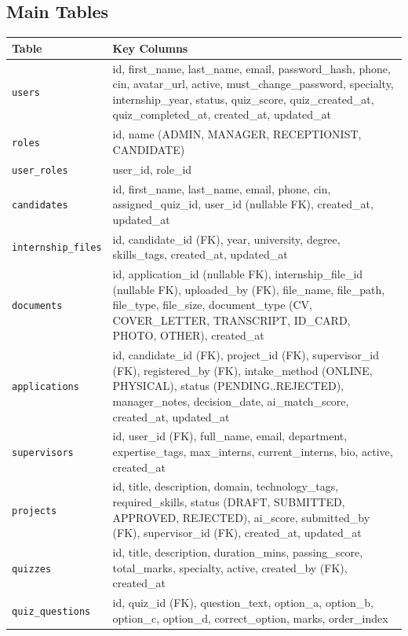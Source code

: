 \subsection{Main Tables}
\begin{table}[H]
\centering
\small
\begin{tabular}{|p{3cm}|p{10cm}|}
\hline
\rowcolor{gray!20}
\textbf{Table} & \textbf{Key Columns} \\
\hline
\texttt{users} & id, first\_name, last\_name, email, password\_hash, phone, cin, avatar\_url, active, must\_change\_password, specialty, internship\_year, status, quiz\_score, quiz\_created\_at, quiz\_completed\_at, created\_at, updated\_at \\
\hline
\texttt{roles} & id, name (ADMIN, MANAGER, RECEPTIONIST, CANDIDATE) \\
\hline
\texttt{user\_roles} & user\_id, role\_id \\
\hline
\texttt{candidates} & id, first\_name, last\_name, email, phone, cin, assigned\_quiz\_id, user\_id (nullable FK), created\_at, updated\_at \\
\hline
\texttt{internship\_files} & id, candidate\_id (FK), year, university, degree, skills\_tags, created\_at, updated\_at \\
\hline
\texttt{documents} & id, application\_id (nullable FK), internship\_file\_id (nullable FK), uploaded\_by (FK), file\_name, file\_path, file\_type, file\_size, document\_type (CV, COVER\_LETTER, TRANSCRIPT, ID\_CARD, PHOTO, OTHER), created\_at \\
\hline
\texttt{applications} & id, candidate\_id (FK), project\_id (FK), supervisor\_id (FK), registered\_by (FK), intake\_method (ONLINE, PHYSICAL), status (PENDING..REJECTED), manager\_notes, decision\_date, ai\_match\_score, created\_at, updated\_at \\
\hline
\texttt{supervisors} & id, user\_id (FK), full\_name, email, department, expertise\_tags, max\_interns, current\_interns, bio, active, created\_at \\
\hline
\texttt{projects} & id, title, description, domain, technology\_tags, required\_skills, status (DRAFT, SUBMITTED, APPROVED, REJECTED), ai\_score, submitted\_by (FK), supervisor\_id (FK), created\_at, updated\_at \\
\hline
\texttt{quizzes} & id, title, description, duration\_mins, passing\_score, total\_marks, specialty, active, created\_by (FK), created\_at \\
\hline
\texttt{quiz\_questions} & id, quiz\_id (FK), question\_text, option\_a, option\_b, option\_c, option\_d, correct\_option, marks, order\_index \\

\end{tabular}
\end{table}

